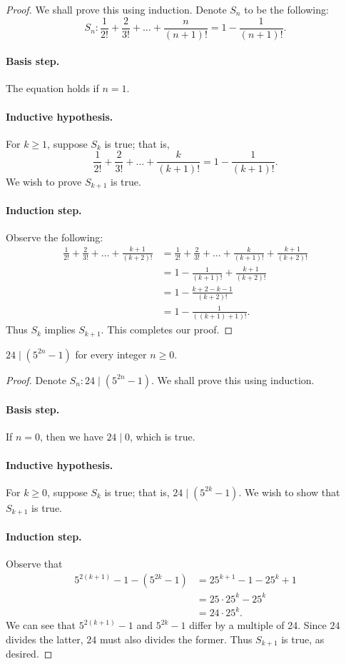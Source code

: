\documentclass{exam}
\begin{document}
\begin{proof}
    We shall prove this using induction. Denote $S_n$ to be the following: $$S_n:\frac1{2!}+\frac2{3!}+\dots+\frac{n}{(n+1)!}=1-\frac{1}{(n+1)!}.$$
    \paragraph{Basis step.} The equation holds if $n = 1$.
    \paragraph{Inductive hypothesis.} For $k\ge 1$, suppose $S_k$ is true; that is, $$\frac1{2!}+\frac2{3!}+\dots+\frac{k}{(k+1)!}=1-\frac{1}{(k+1)!}.$$ We wish to prove $S_{k+1}$ is true.
    \paragraph{Induction step.} Observe the following:
    \begin{align*}
        \frac1{2!}+\frac2{3!}+\dots+\frac{k+1}{(k+2)!}&=\frac1{2!}+\frac2{3!}+\dots+\frac{k}{(k+1)!}+\frac{k+1}{(k+2)!}\\
        &=1-\frac1{(k+1)!}+\frac{k+1}{(k+2)!}\\
        &=1-\frac{k+2-k-1}{(k+2)!}\\
        &=1-\frac{1}{((k+1)+1)!}.
    \end{align*}
    Thus $S_k$ implies $S_{k+1}$. This completes our proof.
\end{proof}

\begin{proposition}{10.9}
    $24\mid(5^{2n}-1)$ for every integer $n\ge0$.
\end{proposition}

\begin{proof}
    Denote $S_n:24\mid(5^{2n}-1)$. We shall prove this using induction.
    \paragraph{Basis step.} If $n = 0$, then we have $24\mid0$, which is true.
    \paragraph{Inductive hypothesis.} For $k\ge0$, suppose $S_k$ is true; that is, $24\mid(5^{2k}-1)$. We wish to show that $S_{k+1}$ is true.
    \paragraph{Induction step.} Observe that
    \begin{align*}
        5^{2(k+1)}-1-(5^{2k}-1)&=25^{k+1}-1-25^k+1\\
        &=25\cdot25^k-25^k\\
        &=24\cdot25^k.
    \end{align*}
    We can see that $5^{2(k+1)}-1$ and $5^{2k}-1$ differ by a multiple of 24. Since $24$ divides the latter, $24$ must also divides the former. Thus $S_{k+1}$ is true, as desired.
\end{proof}
\end{document}

